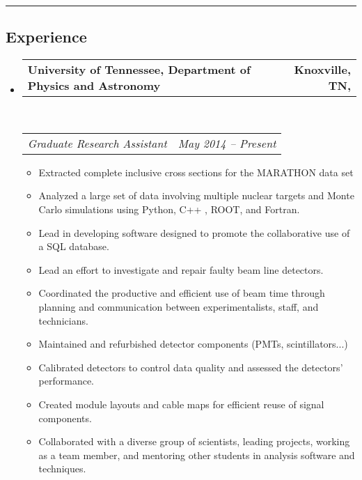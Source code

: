 \documentclass[12pt,letterpaper]{article}
\makeatletter
\newcommand{\headerrow}[2]
{\begin{tabular*}{\linewidth}{l@{\extracolsep{\fill}}r}
	#1 &
	#2 \\
\end{tabular*}}
\makeatother
\begin{document}
\hrule
\vspace{0.4em}
\subsection*{Experience}

\begin{itemize}
	\parskip=0.1em

	\item
	\headerrow
		{\textbf{University of Tennessee, Department of Physics and Astronomy }}
		{\textbf{  Knoxville, TN,}}
	\\
	\headerrow
		{\emph{Graduate Research Assistant }}
		{\emph{May 2014 -- Present}}
	\begin{itemize}
		\item Extracted complete inclusive cross sections for the MARATHON data set
		\item Analyzed a large set of data involving multiple nuclear targets and Monte Carlo simulations using Python, C++ , ROOT, and Fortran.
		\item Lead in developing software designed to promote the collaborative use of a SQL database. 
		\item Lead an effort to investigate and repair faulty beam line detectors.
		\item Coordinated the productive and efficient use of beam time through planning and communication between experimentalists, staff, and technicians.
		\item Maintained and refurbished detector components (PMTs, scintillators...) 
		\item Calibrated detectors to control data quality and assessed the detectors' performance.
		\item Created module layouts and cable maps for efficient reuse of signal components.
		\item Collaborated with a diverse group of scientists, leading projects, working as a team member, and mentoring other students in analysis software and techniques.
	\end{itemize}
\end{itemize}
\end{document}
